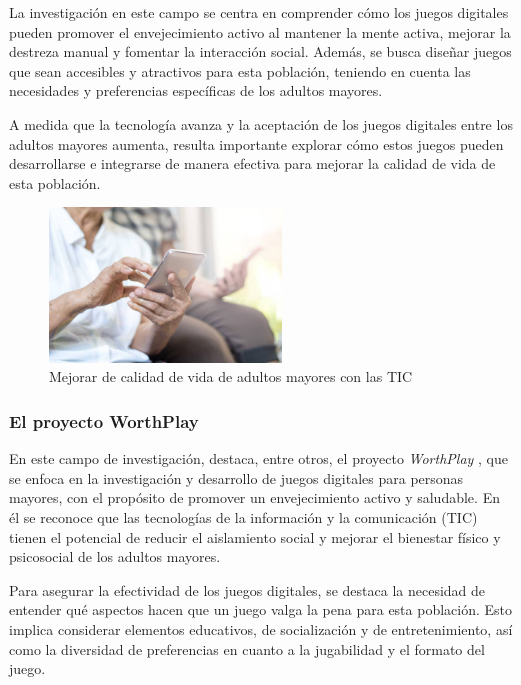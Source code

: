 La investigación en este campo se centra en comprender cómo los juegos digitales pueden promover el envejecimiento activo al mantener la mente activa, mejorar la destreza manual y fomentar la interacción social. Además, se busca diseñar juegos que sean accesibles y atractivos para esta población, teniendo en cuenta las necesidades y preferencias específicas de los adultos mayores.

A medida que la tecnología avanza y la aceptación de los juegos digitales entre los adultos mayores aumenta, resulta importante explorar cómo estos juegos pueden desarrollarse e integrarse de manera efectiva para mejorar la calidad de vida de esta población.

\begin{figure}[ht]
    \centering
    \includegraphics[width=0.55\textwidth]{imgs/digital1.jpg}
    \caption{Mejorar de calidad de vida de adultos mayores con las TIC}
    \label{fig:digital1}
\end{figure}

\subsubsection{El proyecto WorthPlay}

En este campo de investigación, destaca, entre otros, el proyecto \textit{WorthPlay} \parencite{WorthPlay2012}, que se enfoca en la investigación y desarrollo de juegos digitales para personas mayores, con el propósito de promover un envejecimiento activo y saludable. En él se reconoce que las tecnologías de la información y la comunicación (TIC) tienen el potencial de reducir el aislamiento social y mejorar el bienestar físico y psicosocial de los adultos mayores.

Para asegurar la efectividad de los juegos digitales, se destaca la necesidad de entender qué aspectos hacen que un juego valga la pena para esta población. Esto implica considerar elementos educativos, de socialización y de entretenimiento, así como la diversidad de preferencias en cuanto a la jugabilidad y el formato del juego.

